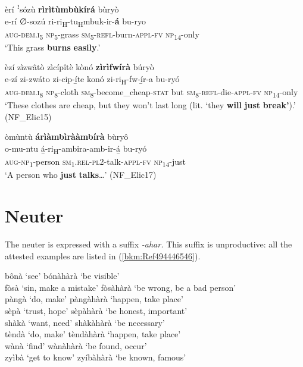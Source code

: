 \ea
\label{bkm:Ref99962252}
èrí ꜝsózù \textbf{rìrìtùmbùkírá} bùryò\\
\gll e-rí    ∅-sozú  ri-ri\textsubscript{H}-tu\textsubscript{H}mbuk-ir-\textbf{á}    bu-ryo\\
\textsc{aug}-\textsc{dem}.\textsc{i}\textsubscript{5}  \textsc{np}\textsubscript{5}-grass  \textsc{sm}\textsubscript{5}-\textsc{refl}-burn-\textsc{appl}-\textsc{fv}  \textsc{np}\textsubscript{14}-only\\
\glt ‘This grass \textbf{burns} \textbf{easily}.’
\z

\ea
èzí zìzwâtò zìcípîtè kònó \textbf{zìrìfwírà} búryò\\
\gll e-zí    zi-zwáto  zi-cip-í̲te konó  zi-ri\textsubscript{H}-fw-í̲r-a    bu-ryó\\
\textsc{aug}-\textsc{dem}.\textsc{i}\textsubscript{8}  \textsc{np}\textsubscript{8}-cloth  \textsc{sm}\textsubscript{8}-become\_cheap-\textsc{stat}
but  \textsc{sm}\textsubscript{8}-\textsc{refl}-die-\textsc{appl}-\textsc{fv}  \textsc{np}\textsubscript{14}-only\\
\glt ‘These clothes are cheap, but they won’t last long (lit. ‘they \textbf{will} \textbf{just} \textbf{break’}).’ (NF\_Elic15)
\z

\ea
\label{bkm:Ref99962254}
òmùntù \textbf{árìàmbìrààmbírà} bùryô\\
\gll o-mu-ntu    á̲-ri\textsubscript{H}-ambira-amb-ir-á̲  bu-ryó\\
\textsc{aug}-\textsc{np}\textsubscript{1}\textsuperscript{\-\-}-person  \textsc{sm}\textsubscript{1}.\textsc{rel}-\textsc{pl}2-talk-\textsc{appl}-\textsc{fv}  \textsc{np}\textsubscript{14}-just\\
\glt ‘A person who \textbf{just} \textbf{talks}…’ (NF\_Elic17)
\z
\section{Neuter}
\label{bkm:Ref489452510}\hypertarget{Toc75352661}{}
The neuter is expressed with a suffix \textit{-ahar.} This suffix is unproductive: all the attested examples are listed in (\ref{bkm:Ref494446546}).

\ea
\label{bkm:Ref494446546}
bônà ‘see’ \tab bónàhàrà ‘be visible’\\
fòsà ‘sin, make a mistake’ \tab fòsàhàrà ‘be wrong, be a bad person’\\
pàngà ‘do, make’ \tab pàngàhàrà ‘happen, take place’\\
sèpà ‘trust, hope’ \tab sèpàhàrà ‘be honest, important’\\
shàkà ‘want, need’ \tab shàkàhàrà ‘be necessary’\\
tèndà ‘do, make’ \tab tèndàhàrà ‘happen, take place’\\
wànà ‘find’ \tab wànàhàrà ‘be found, occur’\\
zyìbà ‘get to know’ \tab zyíbàhàrà ‘be known, famous’\\
\z

